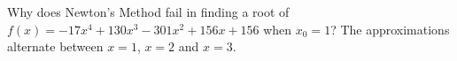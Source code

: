 {Why does Newton's Method fail in finding a root of $f(x) = -17x^4+130x^3-301x^2+156x+156$ when $x_0=1$?
}
{The approximations alternate between $x=1$, $x=2$  and $x=3$.
}


